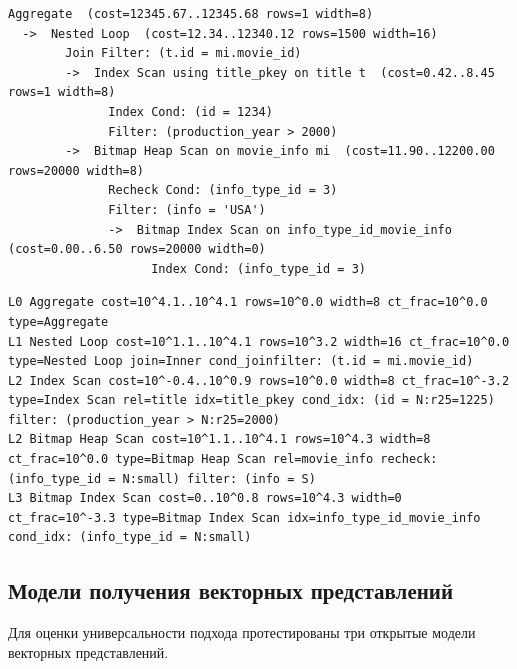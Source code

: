 \begin{lstlisting}[caption={Пример исходного представления плана (\texttt{EXPLAIN} без нормализации)},label={lst:plan_plain_example}]
Aggregate  (cost=12345.67..12345.68 rows=1 width=8)
  ->  Nested Loop  (cost=12.34..12340.12 rows=1500 width=16)
        Join Filter: (t.id = mi.movie_id)
        ->  Index Scan using title_pkey on title t  (cost=0.42..8.45 rows=1 width=8)
              Index Cond: (id = 1234)
              Filter: (production_year > 2000)
        ->  Bitmap Heap Scan on movie_info mi  (cost=11.90..12200.00 rows=20000 width=8)
              Recheck Cond: (info_type_id = 3)
              Filter: (info = 'USA')
              ->  Bitmap Index Scan on info_type_id_movie_info  (cost=0.00..6.50 rows=20000 width=0)
                    Index Cond: (info_type_id = 3)
\end{lstlisting}

\begin{lstlisting}[caption={Пример нормализованного представления плана (после преобразования)},label={lst:plan_norm_example}]
L0 Aggregate cost=10^4.1..10^4.1 rows=10^0.0 width=8 ct_frac=10^0.0 type=Aggregate
L1 Nested Loop cost=10^1.1..10^4.1 rows=10^3.2 width=16 ct_frac=10^0.0 type=Nested Loop join=Inner cond_joinfilter: (t.id = mi.movie_id)
L2 Index Scan cost=10^-0.4..10^0.9 rows=10^0.0 width=8 ct_frac=10^-3.2 type=Index Scan rel=title idx=title_pkey cond_idx: (id = N:r25=1225) filter: (production_year > N:r25=2000)
L2 Bitmap Heap Scan cost=10^1.1..10^4.1 rows=10^4.3 width=8 ct_frac=10^0.0 type=Bitmap Heap Scan rel=movie_info recheck: (info_type_id = N:small) filter: (info = S)
L3 Bitmap Index Scan cost=0..10^0.8 rows=10^4.3 width=0 ct_frac=10^-3.3 type=Bitmap Index Scan idx=info_type_id_movie_info cond_idx: (info_type_id = N:small)
\end{lstlisting}


\subsection{Модели получения векторных представлений}
\label{subsec:embedding_models}

Для оценки универсальности подхода протестированы три открытые модели векторных представлений.

